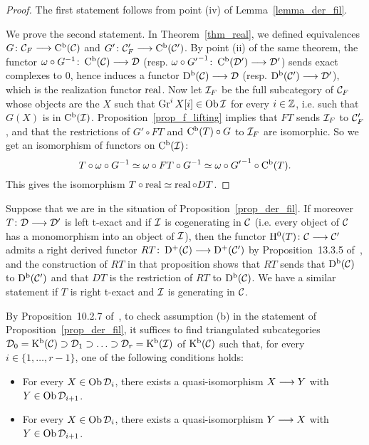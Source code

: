 \begin{proof} 
The first statement follows from point (iv) of Lemma~\ref{lemma_der_fil}.

We prove the second statement. 
In Theorem~\ref{thm_real}, we defined equivalences $G\colon \mathcal{C}_F\longrightarrow\operatorname{\mathrm{C}^b}(\mathcal{C})$ and $G'\colon \mathcal{C}'_F\longrightarrow\operatorname{\mathrm{C}^b}(\mathcal{C}')$.
By point (ii) of the same theorem, the functor $\omega\circ G^{-1}\colon \operatorname{\mathrm{C}^b}(\mathcal{C})\longrightarrow\mathcal{D}$ (resp. $\omega\circ {G'}^{-1}\colon \operatorname{\mathrm{C}^b}(\mathcal{D}')\longrightarrow\mathcal{D}'$) sends exact complexes to $0$, hence
induces a functor $\operatorname{\mathrm{D}^b}(\mathcal{C})\longrightarrow\mathcal{D}$ (resp. $\operatorname{\mathrm{D}^b}(\mathcal{C}')\longrightarrow\mathcal{D}'$), which is the realization functor $\operatorname{real}$.
Now let $\mathcal{I}_F$ be the full subcategory of $\mathcal{C}_F$ whose objects are the $X$ such that $\operatorname{Gr}^iX[i]\in\operatorname{\mathrm{Ob}}\mathcal{I}$ for every $i\in\mathbb{Z}$, i.e. such that $G(X)$
is in $\operatorname{\mathrm{C}^b}(\mathcal{I})$. Proposition~\ref{prop_f_lifting} implies that $FT$ sends
$\mathcal{I}_F$ to $\mathcal{C}'_F$, and that the restrictions of $G'\circ FT$ and $\operatorname{\mathrm{C}^b}(T)\circ G$ to $\mathcal{I}_F$ are isomorphic. So we get an isomorphism of functors on $\operatorname{\mathrm{C}^b}(\mathcal{I})$:
\[T\circ\omega\circ G^{-1}\simeq\omega\circ FT\circ G^{-1}\simeq\omega\circ{G'}^{-1}\circ\operatorname{\mathrm{C}^b}(T).\]
This gives the isomorphism $T\circ\operatorname{real}\simeq\operatorname{real}\circ DT$.
\end{proof}

\begin{remark}
Suppose that we are in the situation of Proposition~\ref{prop_der_fil}.
If moreover $T\colon \mathcal{D}\longrightarrow\mathcal{D}'$ is left t-exact and if $\mathcal{I}$ is cogenerating in $\mathcal{C}$ (i.e. every object of $\mathcal{C}$ has a monomorphism into an object of $\mathcal{I}$), then the functor
$\mathrm{H}^0(T)\colon \mathcal{C}\longrightarrow\mathcal{C}'$ admits a right derived functor $RT\colon \operatorname{\mathrm{D}^+}(\mathcal{C})\longrightarrow\operatorname{\mathrm{D}^+}(\mathcal{C}')$ by Proposition~13.3.5 of~\cite{KS1}, and the construction of $RT$ in that proposition shows that
$RT$ sends that $\operatorname{\mathrm{D}^b}(\mathcal{C})$ to $\operatorname{\mathrm{D}^b}(\mathcal{C}')$ and that $DT$ is the restriction of $RT$ to $\operatorname{\mathrm{D}^b}(\mathcal{C})$. We have a similar statement if $T$ is right t-exact and $\mathcal{I}$ is generating in $\mathcal{C}$.

\label{rmk_der_fil1}
\end{remark}

\begin{remark}
By Proposition~10.2.7 of~\cite{KS1}, to check assumption (b) in the statement of Proposition~\ref{prop_der_fil}, it suffices to find triangulated subcategories
$\mathcal{D}_0=\operatorname{\mathrm{K}^b}(\mathcal{C})\supset\mathcal{D}_1\supset\ldots\supset\mathcal{D}_r=\operatorname{\mathrm{K}^b}(\mathcal{I})$ of $\operatorname{\mathrm{K}^b}(\mathcal{C})$ such that, for every $i\in\{1,\ldots,r-1\}$, one of the following conditions holds:
\begin{itemize}
\item For every $X\in\operatorname{\mathrm{Ob}}\mathcal{D}_i$, there exists a quasi-isomorphism $X\longrightarrow Y$ with $Y\in\operatorname{\mathrm{Ob}}\mathcal{D}_{i+1}$.
\item For every $X\in\operatorname{\mathrm{Ob}}\mathcal{D}_i$, there exists a quasi-isomorphism $Y\longrightarrow X$ with $Y\in\operatorname{\mathrm{Ob}}\mathcal{D}_{i+1}$.

\end{itemize}

\label{rmk_der_fil2}
\end{remark}
